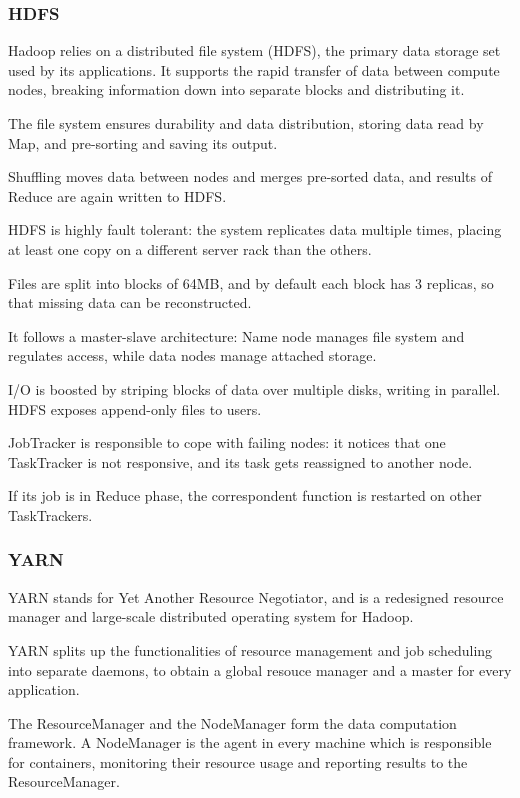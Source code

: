 \subsubsection{HDFS}
Hadoop relies on a distributed file system (HDFS), the primary data storage set used by its applications. It supports the rapid transfer of data between compute nodes, breaking information down into separate blocks and distributing it.

The file system ensures durability and data distribution, storing data read by Map, and pre-sorting and saving its output. 

Shuffling moves data between nodes and merges pre-sorted data, and results of Reduce are again written to HDFS.

HDFS is highly fault tolerant: the system replicates data multiple times, placing at least one copy on a different server rack than the others.

Files are split into blocks of 64MB, and by default each block has 3 replicas, so that missing data can be reconstructed. 

It follows a master-slave architecture: Name node manages file system and regulates access, while data nodes manage attached storage.

I/O is boosted by striping blocks of data over multiple disks, writing in parallel. HDFS exposes append-only files to users.

JobTracker is responsible to cope with failing nodes: it notices that one TaskTracker is not responsive, and its task gets reassigned to another node.

If its job is in Reduce phase, the correspondent function is restarted on other TaskTrackers.

\subsubsection{YARN}
YARN stands for Yet Another Resource Negotiator, and is a redesigned resource manager and large-scale distributed operating system for Hadoop.

YARN splits up the functionalities of resource management and job scheduling into separate daemons, to obtain a global resouce manager and a master for every application.

The ResourceManager and the NodeManager form the data computation framework. A NodeManager is the agent in every machine which is responsible for containers, monitoring their resource usage and reporting results to the ResourceManager.

